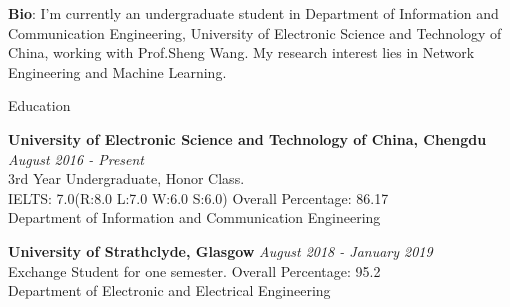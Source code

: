\documentclass{resume} %
\begin{document}
{\bf Bio}: I'm currently an undergraduate student in Department of Information and Communication Engineering, 
University of Electronic Science and Technology of China, working with Prof.Sheng Wang. My research interest lies in Network Engineering and Machine Learning.

\begin{rSection}{Education}

\item \vspace{-1em} {\bf University of Electronic Science and Technology of China, Chengdu} \hfill {\em August 2016 - Present} 
\\ 3rd Year Undergraduate, Honor Class. 
\\IELTS: 7.0(R:8.0 L:7.0 W:6.0 S:6.0)\hfill { Overall Percentage: 86.17 }
\\ Department of Information and Communication Engineering


\item {\bf University of Strathclyde, Glasgow} \hfill {\em August 2018 - January 2019} 
\\ Exchange Student for one semester.\hfill { Overall Percentage: 95.2 }
\\Department of Electronic and Electrical Engineering 


\end{rSection}
\end{document}
